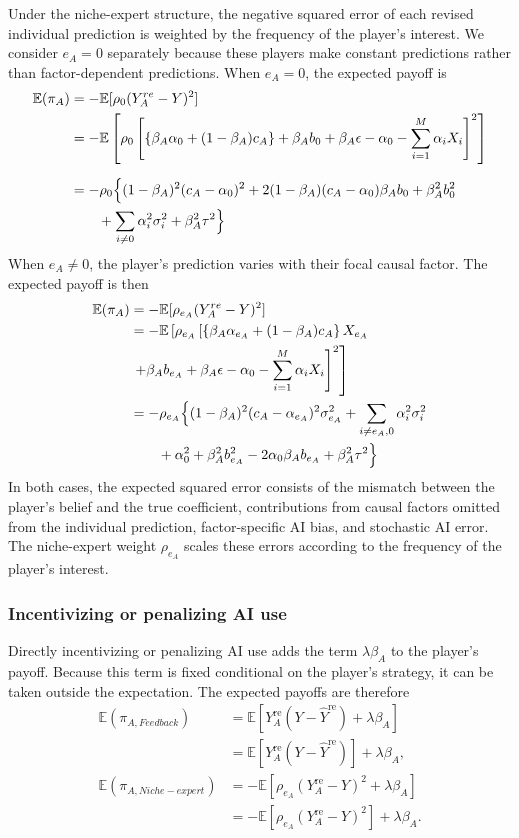 \documentclass[12pt]{article}
\begin{document}
Under the niche-expert structure, the negative squared error of each revised individual prediction is weighted by the frequency of the player's interest. 
We consider $e_A=0$ separately because these players make constant predictions rather than factor-dependent predictions. 
When $e_A=0$, the expected payoff is
\begin{align}
\mathbb{E}(\pi_A)
&= -\mathbb{E}[\rho_{0}(Y_A^{re} - Y)^2] \\
&= -\mathbb{E}\left[\rho_{0}\left[\left\{\beta_A\alpha_0 + (1-\beta_A)c_A\right\} + \beta_Ab_0 + \beta_A\epsilon - \alpha_0 - \sum_{i = 1}^{M}\alpha_iX_i\right]^2\right] \\[6pt]
&= -\rho_{0}\Bigl\{(1-\beta_A)^2(c_A - \alpha_0)^2 + 2(1-\beta_A)(c_A - \alpha_0)\beta_Ab_0 + \beta_A^2 b_0^2 \\
&\qquad + \sum_{i \neq 0}\alpha_i^2\sigma_i^2 + \beta_A^2\tau^2\Bigr\}
\end{align}
When $e_A\neq0$, the player's prediction varies with their focal causal factor. The expected payoff is then
\begin{align}
\mathbb{E}(\pi_A)
&= -\mathbb{E}[\rho_{e_A}(Y_A^{re} - Y)^2] \\
&= -\mathbb{E}\left[\rho_{e_A}\left[\left\{\beta_A\alpha_{e_A} + (1-\beta_A)c_A\right\} X_{e_A}\right.\right.\\
&\left.\left.+ \beta_Ab_{e_A} + \beta_A\epsilon - \alpha_0 - \sum_{i = 1}^{M}\alpha_iX_i\right]^2\right] \\
&= -\rho_{e_A}\Bigl\{(1-\beta_A)^2(c_A - \alpha_{e_A})^2\sigma_{e_A}^2 + \sum_{i \neq e_A, 0}\alpha_i^2\sigma_i^2 \\
&\qquad + \alpha_0^2 + \beta_A^2 b_{e_A}^2 - 2\alpha_0\beta_Ab_{e_A} + \beta_A^2\tau^2\Bigr\}
\end{align}
In both cases, the expected squared error consists of the mismatch between the player's belief and the true coefficient, contributions from causal factors omitted from the individual prediction, factor-specific AI bias, and stochastic AI error. 
The niche-expert weight $\rho_{e_A}$ scales these errors according to the frequency of the player's interest.

\subsubsection*{Incentivizing or penalizing AI use}

Directly incentivizing or penalizing AI use adds the term $\lambda\beta_A$ to the player's payoff. Because this term is fixed conditional on the player's strategy, it can be taken outside the expectation. The expected payoffs are therefore
\begin{align}
\mathbb{E}(\pi_{A, Feedback}) &=\mathbb{E}\left[Y_A^{\mathrm{re}}(Y-\hat{Y}^{\mathrm{re}}) + \lambda\beta_A\right]\\
&= \mathbb{E}\left[Y_A^{\mathrm{re}}(Y-\hat{Y}^{\mathrm{re}})\right] + \lambda\beta_A,\\
\mathbb{E}(\pi_{A, Niche-expert}) &= -\mathbb{E}\left[\rho_{e_A}(Y_A^{\mathrm{re}}-Y)^2 + \lambda\beta_A\right] \\
&= -\mathbb{E}\left[\rho_{e_A}(Y_A^{\mathrm{re}}-Y)^2\right] + \lambda\beta_A.
\end{align}
\end{document}
